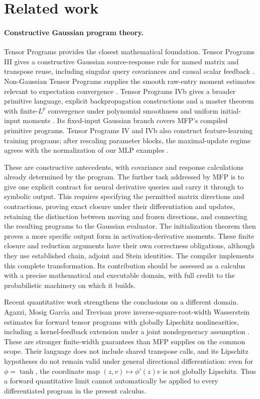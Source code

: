 \section{Related work}

\paragraph{Constructive Gaussian program theory.}
Tensor Programs provides the closest mathematical foundation.
Tensor Programs III gives a constructive Gaussian source-response rule for
named matrix and transpose reuse, including singular query covariances and
causal scalar feedback \cite{yang2021tp3}. Non-Gaussian Tensor Programs supplies
the smooth raw-entry moment estimates relevant to expectation convergence
\cite{golikov2022nongaus}. Tensor Programs IVb gives a broader primitive
language, explicit backpropagation constructions and a master theorem with
finite-$L^p$ convergence under polynomial smoothness and uniform initial-input
moments \cite{yang2023tp4b}. Its fixed-input Gaussian branch covers MFP's
compiled primitive programs. Tensor Programs IV and IVb also construct
feature-learning training programs; after rescaling parameter blocks, the
maximal-update regime agrees with the normalization of our MLP examples
\cite{yang2021tp4,yang2023tp4b}.

These are constructive antecedents, with covariance and response calculations
already determined by the program. The further task addressed by MFP is to give
one explicit contract for neural derivative queries and carry it through to
symbolic output. This requires specifying the permitted matrix directions and
contractions, proving exact closure under their differentiation and updates,
retaining the distinction between moving and frozen directions, and connecting
the resulting programs to the Gaussian evaluator. The initialization theorem
then proves a more specific output form in activation-derivative moments.
These finite closure and reduction arguments have their own correctness
obligations, although they use established chain, adjoint and Stein identities.
The compiler implements this complete transformation. Its contribution should
be assessed as a calculus with a precise mathematical and executable domain,
with full credit to the probabilistic machinery on which it builds.

Recent quantitative work strengthens the conclusions on a different domain.
Agazzi, Mosig Garc\'{\i}a and Trevisan prove inverse-square-root-width
Wasserstein estimates for forward tensor programs with globally Lipschitz
nonlinearities, including a kernel-feedback extension under a joint
nondegeneracy assumption \cite{agazzi2026quantitative}. These are stronger
finite-width guarantees than MFP supplies on the common scope. Their language
does not include shared transpose calls, and its Lipschitz hypotheses do not
remain valid under general directional differentiation: even for
$\phi=\tanh$, the coordinate map $(z,v)\mapsto\phi'(z)v$ is not globally
Lipschitz. Thus a forward quantitative limit cannot automatically be applied
to every differentiated program in the present calculus.

